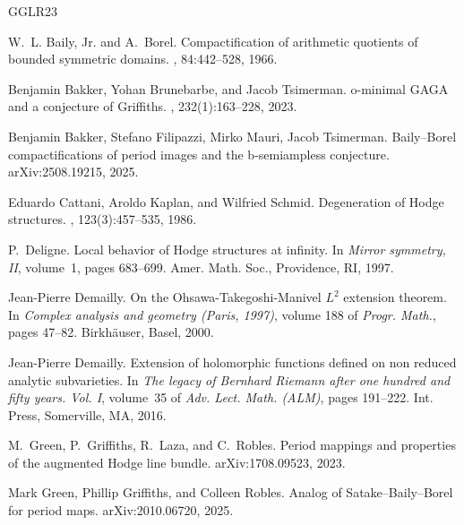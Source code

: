 \documentclass[12pt]{amsart}
\numberwithin{equation}{section}
\numberwithin{table}{section}
\theoremstyle{definition}
\theoremstyle{definition}
\theoremstyle{remark}
\begin{document}
%
%
\def\cprime{$'$} \def\Dbar{\leavevmode\lower.6ex\hbox to 0pt{\hskip-.23ex
  \accent"16\hss}D}
\begin{thebibliography}{GGLR23}

W.~L. Baily, Jr. and A.~Borel.
\newblock Compactification of arithmetic quotients of bounded symmetric
  domains.
, 84:442--528, 1966.

Benjamin Bakker, Yohan Brunebarbe, and Jacob Tsimerman.
\newblock o-minimal {GAGA} and a conjecture of {G}riffiths.
, 232(1):163--228, 2023.

Benjamin Bakker, Stefano Filipazzi, Mirko Mauri, Jacob Tsimerman.
\newblock Baily--Borel compactifications of period images and the b-semiampless conjecture.
\newblock arXiv:2508.19215, 2025.

Eduardo Cattani, Aroldo Kaplan, and Wilfried Schmid.
\newblock Degeneration of {H}odge structures.
, 123(3):457--535, 1986.

P.~Deligne.
\newblock Local behavior of {H}odge structures at infinity.
\newblock In {\em Mirror symmetry, {II}}, volume~1, pages 683--699. Amer. Math.
  Soc., Providence, RI, 1997.

Jean-Pierre Demailly.
\newblock On the {O}hsawa-{T}akegoshi-{M}anivel {$L^2$} extension theorem.
\newblock In {\em Complex analysis and geometry ({P}aris, 1997)}, volume 188 of
  {\em Progr. Math.}, pages 47--82. Birkh\"{a}user, Basel, 2000.

Jean-Pierre Demailly.
\newblock Extension of holomorphic functions defined on non reduced analytic
  subvarieties.
\newblock In {\em The legacy of {B}ernhard {R}iemann after one hundred and
  fifty years. {V}ol. {I}}, volume~35 of {\em Adv. Lect. Math. (ALM)}, pages
  191--222. Int. Press, Somerville, MA, 2016.

M.~Green, P.~Griffiths, R.~Laza, and C.~Robles.
\newblock Period mappings and properties of the augmented {H}odge line bundle.
\newblock arXiv:1708.09523, 2023.

Mark Green, Phillip Griffiths, and Colleen Robles.
\newblock Analog of {S}atake--{B}aily--{B}orel for period maps.
\newblock arXiv:2010.06720, 2025.


\end{thebibliography}
\end{document}
